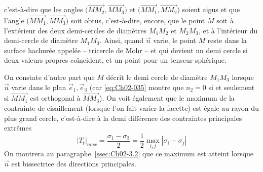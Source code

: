 c'est-à-dire que les angles $\bigl( \vec{MM_2},\vec{MM_3} \bigr)$ et  $\bigl( \vec{MM_1},\vec{MM_2} \bigr)$ soient aigus et que l'angle $\bigl( \vec{MM_1}, \vec{MM_3} \bigr)$ soit obtus, c'est-à-dire, encore, que le point $M$ soit à l'extérieur des deux demi-cercles de diamètres $M_1M_2$ et $M_2M_3$, et à l'intérieur du demi-cercle de diamètre $M_1M_3$.
Ainsi, quand $\vec{n}$ varie, le point $M$ reste dans la surface hachurée appelée -- tricercle de Mohr -- et qui devient un demi cercle si deux valeurs propres coïncident, et un point pour un tenseur sphérique.

On constate d'autre part que $M$ décrit le demi cercle de diamètre $M_1M_3$ lorsque $\vec{n}$ varie dans le plan $\vec{e}_1, \vec{e}_3$ (car \eqref{eq:Ch02-035} montre que $n_2 = 0$  si et seulement si $\vec{MM_1}$ est orthogonal à $\vec{MM_3}$).
On voit également que le maximum de la contrainte de cisaillement (lorsque l'on fait varier la facette) est égale au rayon du plus grand cercle, c'est-à-dire à la demi différence des contraintes principales extrêmes
\begin{equation}
    |T_t|_{max} = \frac{\sigma_1 - \sigma_3}{2} = \frac{1}{2} \max_{i,j} |\sigma_i - \sigma_j|
    \label{eq:Ch02-039}
\end{equation}
On montrera au paragraphe~\ref{ssec:Ch02-3.2} que ce maximum est atteint lorsque $\vec{n}$ est bissectrice des directions principales.  


